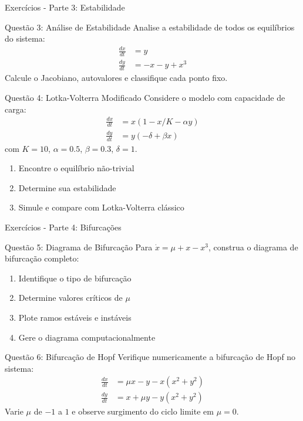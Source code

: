 \begin{frame}[allowframebreaks]{Exercícios - Parte 3: Estabilidade}
\begin{block}{Questão 3: Análise de Estabilidade}
Analise a estabilidade de todos os equilíbrios do sistema:
\begin{align*}
\frac{dx}{dt} &= y\\
\frac{dy}{dt} &= -x - y + x^3
\end{align*}
Calcule o Jacobiano, autovalores e classifique cada ponto fixo.
\end{block}

\begin{block}{Questão 4: Lotka-Volterra Modificado}
Considere o modelo com capacidade de carga:
\begin{align*}
\frac{dx}{dt} &= x(1 - x/K - \alpha y)\\
\frac{dy}{dt} &= y(-\delta + \beta x)
\end{align*}
com $K=10$, $\alpha=0.5$, $\beta=0.3$, $\delta=1$.
\begin{enumerate}
    \item Encontre o equilíbrio não-trivial
    \item Determine sua estabilidade
    \item Simule e compare com Lotka-Volterra clássico
\end{enumerate}
\end{block}
\end{frame}

\begin{frame}[allowframebreaks]{Exercícios - Parte 4: Bifurcações}
\begin{block}{Questão 5: Diagrama de Bifurcação}
Para $\dot{x} = \mu + x - x^3$, construa o diagrama de bifurcação completo:
\begin{enumerate}
    \item Identifique o tipo de bifurcação
    \item Determine valores críticos de $\mu$
    \item Plote ramos estáveis e instáveis
    \item Gere o diagrama computacionalmente
\end{enumerate}
\end{block}

\begin{block}{Questão 6: Bifurcação de Hopf}
Verifique numericamente a bifurcação de Hopf no sistema:
\begin{align*}
\frac{dx}{dt} &= \mu x - y - x(x^2 + y^2)\\
\frac{dy}{dt} &= x + \mu y - y(x^2 + y^2)
\end{align*}
Varie $\mu$ de $-1$ a $1$ e observe surgimento do ciclo limite em $\mu = 0$.
\end{block}
\end{frame}

